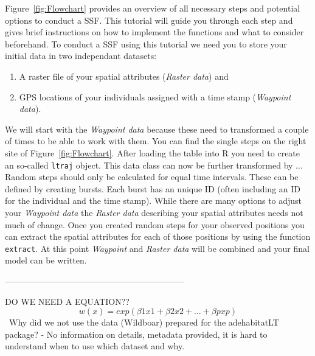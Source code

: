 \documentclass[11pt, a4paper]{article}\usepackage[]{graphicx}\usepackage[]{color}
\begin{document}
Figure~\ref{fig:Flowchart} provides an overview of all necessary steps and potential options to conduct a SSF. This tutorial will guide you through each step and gives brief instructions on how to implement the functions and what to consider beforehand.
To conduct a SSF using this tutorial we need you to store your initial data  in two independant datasets: \begin{enumerate} \item {A raster file of your spatial attributes (\emph{Raster data})} and \item{GPS locations of your individuals assigned with a time stamp (\emph{Waypoint data})}. \end{enumerate} 
We will start with the \emph{Waypoint data} because these need to transformed a couple of times to be able to work with them. You can find the single steps on the right site of Figure~\ref{fig:Flowchart}. After loading the table into R you need to create an so-called \texttt{ltraj} object. This data class can now be further transformed by ... Random steps should only be calculated for equal time intervals. These can be defined by creating bursts. Each burst has an unique ID (often including an ID for the individual and the time stamp). While there are many options to adjust your \emph{Waypoint data} the \emph{Raster data} describing your spatial attributes needs not much of change. Once you created random steps for your observed positions you can extract the spatial attributes for each of those positions by using the function \texttt{extract}. At this point \emph{Waypoint} and \emph{Raster data} will be combined and your final model can be written.   

---------------------------------------------------------------

DO WE NEED A EQUATION??
\[
\displaystyle w(x) = exp(\beta1 x1 + \beta2x2 + ... + \beta p xp)
\]
\
Why did we not use the data (Wildboar) prepared for the adehabitatLT package? - No information on details, metadata provided, it is hard to understand when to use which dataset and why.
\end{document}
